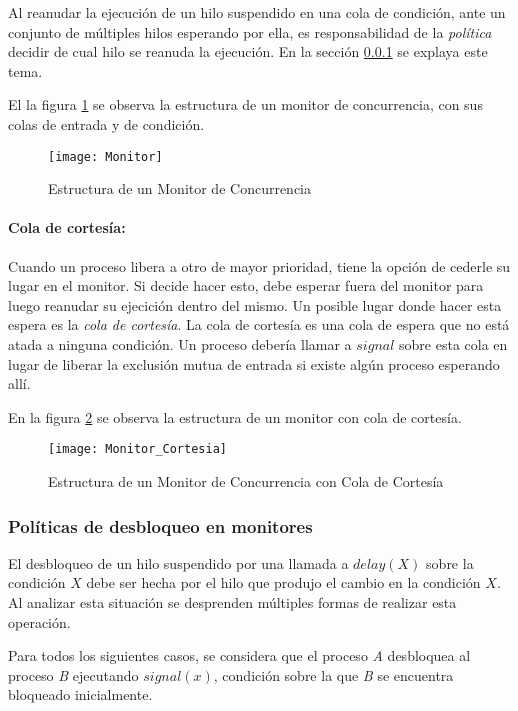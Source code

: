 Al reanudar la ejecución de un hilo suspendido en una cola de condición, ante un
conjunto de múltiples hilos esperando por ella, es responsabilidad de la
\textit{política} decidir de cual hilo se reanuda la ejecución. En la sección
\ref{politica_monitor} se explaya este tema.

El la figura \ref{fig:monitor01} se observa la estructura de un monitor de
concurrencia, con sus colas de entrada y de condición.

\begin{figure}[h]
  \centering
  \texttt{[image: Monitor]}
  \caption{Estructura de un Monitor de Concurrencia}
  \label{fig:monitor01}
\end{figure}

\paragraph{Cola de cortesía:}
Cuando un proceso libera a otro de mayor prioridad, tiene la opción de cederle
su lugar en el monitor. Si decide hacer esto, debe esperar fuera del monitor
para luego reanudar su ejecición dentro del mismo. Un posible lugar donde hacer
esta espera es la \textit{cola de cortesía}.
La cola de cortesía es una cola de espera que no está atada a ninguna condición.
Un proceso debería llamar a $signal$ sobre esta cola en lugar de liberar la
exclusión mutua de entrada si existe algún proceso esperando allí.

En la figura \ref{fig:monitor_cortesia} se observa la estructura de un monitor
con cola de cortesía.

\begin{figure}[h]
  \centering
  \texttt{[image: Monitor\_Cortesia]}
  \caption{Estructura de un Monitor de Concurrencia con Cola de Cortesía}
  \label{fig:monitor_cortesia}
\end{figure}

\subsubsection{Políticas de desbloqueo en monitores}
\label{politica_monitor}
El desbloqueo de un hilo suspendido por una llamada a $delay(X)$ sobre la
condición $X$ debe ser hecha por el hilo que produjo el cambio en la condición
$X$. Al analizar esta situación se desprenden múltiples formas de realizar esta
operación.

Para todos los siguientes casos, se considera que el proceso \textit{A}
desbloquea al proceso \textit{B} ejecutando $signal(x)$, condición sobre la que
\textit{B} se encuentra bloqueado inicialmente.

